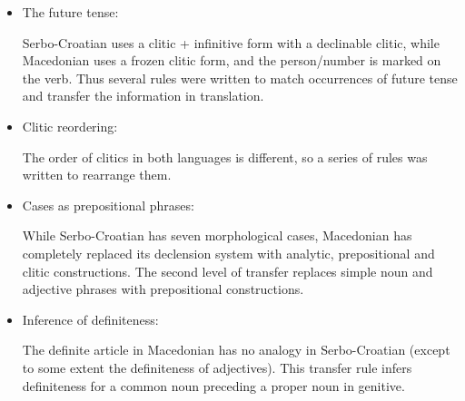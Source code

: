 \documentclass{book}
\begin{document}
\begin{itemize}
\item The future tense:

Serbo-Croatian uses a clitic + infinitive form with a declinable clitic, while
Macedonian uses a frozen clitic form, and the person/number is marked on the verb.
Thus several rules were written to match occurrences of future tense
and transfer the information in translation.

\item Clitic reordering:


The order of clitics in both languages is different, so a series of rules was written to rearrange them.

\item Cases as prepositional phrases:


While Serbo-Croatian has seven morphological cases, Macedonian has 
completely replaced its declension system with analytic, prepositional and clitic constructions.
The second level of transfer replaces simple noun and adjective phrases with prepositional constructions.

\item Inference of definiteness:


The definite article in Macedonian has no analogy in Serbo-Croatian (except to some extent the definiteness of adjectives). This transfer rule infers definiteness for a common noun preceding
a proper noun in genitive.

\end{itemize}
\end{document}
